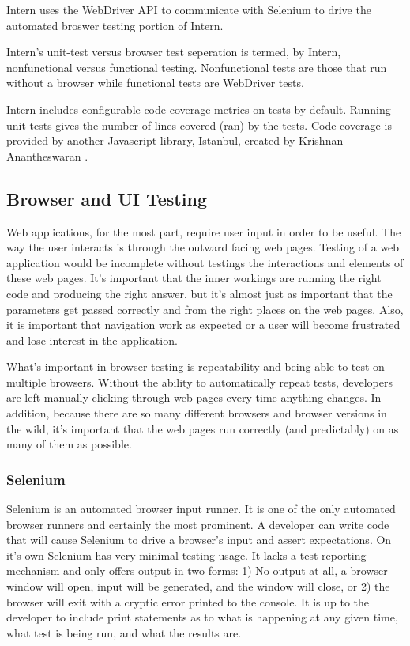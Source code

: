 \documentclass[11pt]{article}
\begin{document}
Intern uses the WebDriver API to communicate with Selenium to drive the automated broswer testing portion of Intern.

Intern's unit-test versus browser test seperation is termed, by Intern, nonfunctional versus functional testing. Nonfunctional tests are those that run without a browser while functional tests are WebDriver tests.

Intern includes configurable code coverage metrics on tests by default. Running unit tests gives the number of lines covered (ran) by the tests. Code coverage is provided by another Javascript library, Istanbul, created by Krishnan Anantheswaran \cite{Istanbul}.

\subsection{Browser and UI Testing}
Web applications, for the most part, require user input in order to be useful. The way the user interacts is through the outward facing web pages. Testing of a web application would be incomplete without testings the interactions and elements of these web pages. It's important that the inner workings are running the right code and producing the right answer, but it's almost just as important that the parameters get passed correctly and from the right places on the web pages. Also, it is important that navigation work as expected or a user will become frustrated and lose interest in the application.

What's important in browser testing is repeatability and being able to test on multiple browsers. Without the ability to automatically repeat tests, developers are left manually clicking through web pages every time anything changes. In addition, because there are so many different browsers and browser versions in the wild, it's important that the web pages run correctly (and predictably) on as many of them as possible.

\subsubsection{Selenium\cite{Selenium}}
Selenium is an automated browser input runner. It is one of the only automated browser runners and certainly the most prominent. A developer can write code that will cause Selenium to drive a browser's input and assert expectations. On it's own Selenium has very minimal testing usage. It lacks a test reporting mechanism and only offers output in two forms: 1) No output at all, a browser window will open, input will be generated, and the window will close, or 2) the browser will exit with a cryptic error printed to the console. It is up to the developer to include print statements as to what is happening at any given time, what test is being run, and what the results are.
\end{document}
